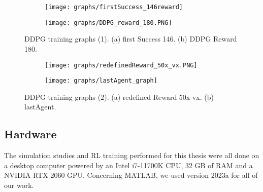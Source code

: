\begin{figure}[h]
	\begin{subfigure}{\textwidth} %
		\centering
		\texttt{[image: graphs/firstSuccess\_146reward]}  %
		\caption{}
		\label{figure: RL a}
	\end{subfigure}
	\begin{subfigure}{\textwidth}
		\centering
		\texttt{[image: graphs/DDPG\_reward\_180.PNG]}  
		\caption{}
		\label{figure: RL b}
	\end{subfigure} 
		\caption[DDPG training graphs (1)]{DDPG training graphs (1). (a) first Success 146. (b) DDPG Reward 180.}
	\label{figure: DDPG learning graphs 1}
\end{figure}

\begin{figure}[h]
	\begin{subfigure}{\textwidth} %
		\centering
		\texttt{[image: graphs/redefinedReward\_50x\_vx.PNG]}  %
		\caption{}
		\label{figure: RL c}
	\end{subfigure}
	\begin{subfigure}{\textwidth}
		\centering
		\texttt{[image: graphs/lastAgent\_graph]}  
		\caption{}
		\label{figure: RL d}
	\end{subfigure} 
	\caption[DDPG training graphs (2)]{DDPG training graphs (2).  (a) redefined Reward 50x vx. (b) lastAgent.}
	\label{figure: DDPG learning graphs 2}
\end{figure}


\subsection{Hardware}
The simulation studies and RL training performed for this thesis were all done on a desktop computer powered by an Intel i7-11700K CPU, 32 GB of RAM and a NVIDIA RTX 2060 GPU.
Concerning MATLAB, we used version 2023a for all of our work.

